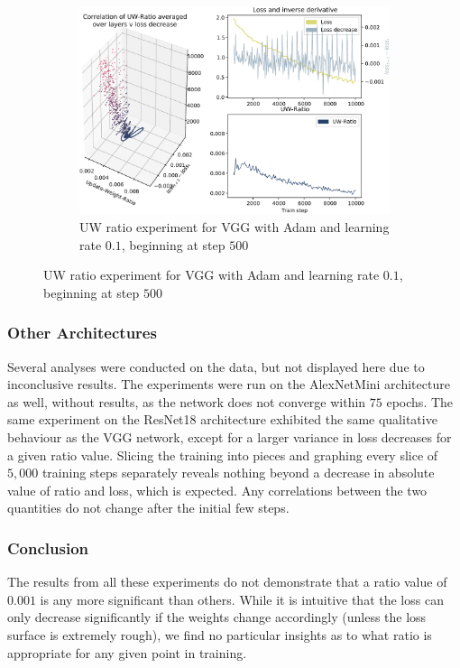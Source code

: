 \begin{figure}
    \begin{subfigure}{\textwidth}
        \centering
        \includegraphics[width=\linewidth]{gfx/diagrams/experiments/ratio_loss_correlation/vgg_adam_01_500_10000.pdf}
        \caption{UW ratio experiment for VGG with Adam and learning rate $0.1$,
        beginning at step $500$}
        \label{fig:ratio_loss_corr_vgg_adam_01_500}
    \end{subfigure}
\end{figure}

\subsubsection{Other Architectures}

Several analyses were conducted on the data, but not displayed here due to
inconclusive results.
The experiments were run on the AlexNetMini architecture as well, without
results, as the network does not converge within $75$ epochs.
The same experiment on the ResNet18 architecture exhibited the same qualitative
behaviour as the VGG network, except for a larger variance in loss decreases for
a given ratio value. Slicing the training into pieces and graphing every slice
of $5,000$ training steps separately reveals nothing beyond a decrease in
absolute value of ratio and loss, which is expected. Any correlations between
the two quantities do not change after the initial few steps.

\subsubsection{Conclusion}

The results from all these experiments do not demonstrate that a ratio value
of $0.001$ is any more significant than others. While it is intuitive that the loss
can only decrease significantly if the weights change accordingly (unless the
loss surface is extremely rough), we find no particular insights as to what
ratio is appropriate for any given point in training.

